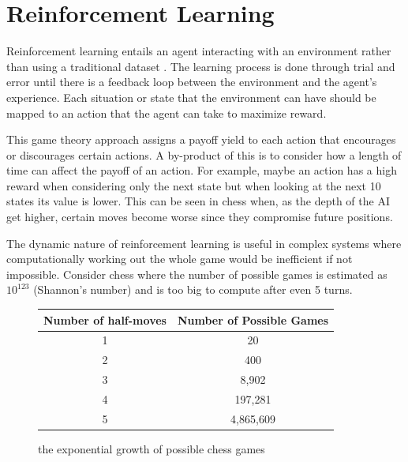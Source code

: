 \documentclass[10pt,a4paper]{report}
\begin{document}
	\chapter{Reinforcement Learning}
		Reinforcement learning entails an agent interacting with an environment rather than using a traditional dataset \autocite[p. 105]{DeepLearning}.
		The learning process is done through trial and error until there is a feedback loop between the environment and the agent's experience. Each situation
		or state that the environment can have should be mapped to an action that the agent can take to maximize reward. \par
		This game theory approach assigns a payoff yield to each action that encourages or discourages certain actions.
		A by-product of this is to consider how a length of time can affect the payoff of an action. For example, maybe an action has
		a high reward when considering only the next state but when looking at the next 10 states its value is lower. This can be seen
		in chess when, as the depth of the AI get higher, certain moves become worse since they compromise future positions. \par
		The dynamic nature of reinforcement learning is useful in complex systems where computationally working out the whole game would be inefficient if not impossible.
		Consider chess \autocite{shannon1950xxii} where the number of possible games is estimated as $10^{123}$ (Shannon's number) and is too big to compute after even 5 turns.
		\begin{figure}[h]
			\centering
			\begin{tabular}{||c c||}
				\hline
				Number of half-moves & Number of Possible Games\\ [0.5ex]
				\hline\hline
				1 & 20\\
				\hline
				2 & 400\\
				\hline
				3 & 8,902\\
				\hline
				4 & 197,281\\
				\hline
				5 & 4,865,609\\[1ex]
				\hline
			\end{tabular}
			\caption{the exponential growth of possible chess games}
			\label{fig:possible-chess-games}
		\end{figure}
\end{document}
